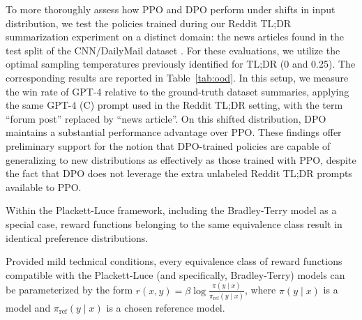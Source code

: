 To more thoroughly assess how PPO and DPO perform under shifts in input distribution, we test the policies trained during our Reddit TL;DR summarization experiment on a distinct domain: the news articles found in the test split of the CNN/DailyMail dataset \citep{nallapati-etal-2016-abstractive}. For these evaluations, we utilize the optimal sampling temperatures previously identified for TL;DR (0 and 0.25). The corresponding results are reported in Table~\ref{tab:ood}. In this setup, we measure the win rate of GPT-4 relative to the ground-truth dataset summaries, applying the same GPT-4 (C) prompt used in the Reddit TL;DR setting, with the term ``forum post'' replaced by ``news article''. On this shifted distribution, DPO maintains a substantial performance advantage over PPO. These findings offer preliminary support for the notion that DPO-trained policies are capable of generalizing to new distributions as effectively as those trained with PPO, despite the fact that DPO does not leverage the extra unlabeled Reddit TL;DR prompts available to PPO.

\begin{lemma}\label{lemma:same_prefrence} Within the Plackett-Luce framework, including the Bradley-Terry model as a special case, reward functions belonging to the same equivalence class result in identical preference distributions.
\end{lemma}

\begin{theorem}\label{thm:main}
    Provided mild technical conditions, every equivalence class of reward functions compatible with the Plackett-Luce (and specifically, Bradley-Terry) models can be parameterized by the form ${r(x, y) = \beta \log \frac{\pi(y\mid x)}{\pi_\text{ref}(y\mid x)}}$, where $\pi(y\mid x)$ is a model and $\pi_\text{ref}(y \mid x)$ is a chosen reference model.
\end{theorem}